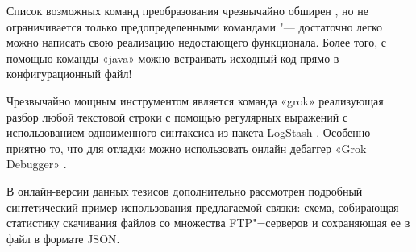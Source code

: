 \documentclass[10pt, a5paper]{article}
\begin{document}
Список возможных команд преобразования чрезвычайно обширен \cite{Pynkin4}, но не ограничивается только предопределенными командами "--- достаточно легко можно написать свою реализацию недостающего функционала. Более того, с помощью команды «java» можно встраивать исходный код прямо в конфигурационный файл!

Чрезвычайно мощным инструментом является команда «grok» реализующая разбор любой текстовой строки с помощью регулярных выражений с использованием одноименного синтаксиса из пакета LogStash \cite{Pynkin5}. Особенно приятно то, что для отладки можно использовать онлайн дебаггер «Grok Debugger» \cite{Pynkin6}.

В онлайн-версии данных тезисов дополнительно рассмотрен подробный синтетический пример использования предлагаемой связки:  схема, собирающая статистику скачивания файлов со множества FTP"=серверов и сохраняющая ее в файл в формате JSON.
\end{document}
